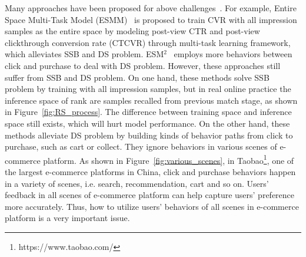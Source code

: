 \documentclass[sigconf]{acmart}
\begin{document}


Many approaches have been proposed for above challenges~\cite{2018ESMM,2020ESM,introrelated2008One,introrelated2016Bid}. For example, Entire Space Multi-Task Model (ESMM)~\cite{2018ESMM} is proposed to train CVR with all impression samples as the entire space by modeling post-view CTR and post-view clickthrough conversion rate (CTCVR) through multi-task learning framework, which alleviates SSB and DS problem.
ESM$^2$~\cite{2020ESM} employs more behaviors between click and purchase to deal with DS problem. 
However, these approaches still suffer from SSB and DS problem. 
On one hand, these methods solve SSB problem by training with all impression samples, but in real online practice the inference space of rank are samples recalled from previous match stage, as shown in Figure~\ref{fig:RS_process}. The difference between training space and inference space still exists, which will hurt model performance. 
On the other hand, these methods alleviate DS problem by building kinds of behavior paths from  click to purchase, such as cart or collect. They  ignore behaviors in various scenes of e-commerce platform. 
As shown in Figure~\ref{fig:various_scenes}, in Taobao\footnote{https://www.taobao.com/}, one of the largest e-commerce platforms in China, click and purchase behaviors happen in a variety of scenes, i.e. search, recommendation, cart and so on. Users’ feedback in all scenes of e-commerce platform can help capture users’ preference more accurately. Thus, how to utilize users’ behaviors of all scenes in e-commerce platform is a very important issue.
\end{document}

